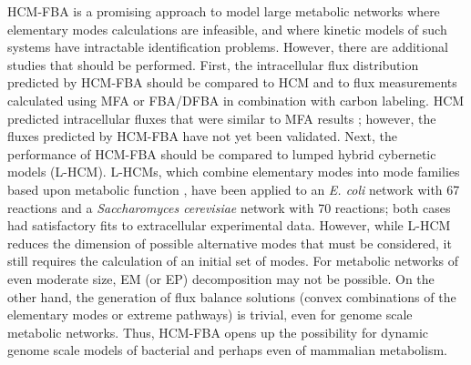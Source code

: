 \documentclass[10pt,twocolumn,twoside,final]{IEEEtran}
\begin{document}
HCM-FBA is a promising approach to model large metabolic networks where elementary modes calculations are infeasible,
and where kinetic models of such systems have intractable identification problems.
However, there are additional studies that should be performed.
First, the intracellular flux distribution predicted by HCM-FBA should be compared to HCM and to flux measurements calculated using MFA or FBA/DFBA in combination with carbon labeling.
HCM predicted intracellular fluxes that were similar to MFA results \cite{2008_kim_varner_ramkrishna_BiotechProg}; however, the fluxes predicted by HCM-FBA have not yet been validated.
Next, the performance of HCM-FBA should be compared to lumped hybrid cybernetic models (L-HCM).
L-HCMs, which combine elementary modes into mode families based upon metabolic function \cite{2010_song,Song:2011aa},
have been applied to an \textit{E. coli} network with 67 reactions and a \textit{Saccharomyces cerevisiae} network with 70 reactions;
both cases had satisfactory fits to extracellular experimental data.
However, while L-HCM reduces the dimension of possible alternative modes that must be considered, it still requires the calculation of an initial set of modes.
For metabolic networks of even moderate size, EM (or EP) decomposition may not be possible.
On the other hand, the generation of flux balance solutions (convex combinations of the elementary modes or extreme pathways) is trivial, even for genome scale metabolic networks.
Thus, HCM-FBA opens up the possibility for dynamic genome scale models of bacterial and perhaps even of mammalian metabolism.
\end{document}
